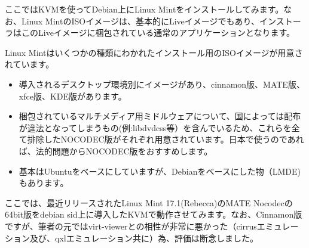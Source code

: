 \documentclass[mingoth,a4paper]{jsarticle}
\begin{document}
ここではKVMを使ってDebian上にLinux Mintをインストールしてみます。なお、Linux MintのISOイメージは、基本的にLiveイメージでもあり、インストーラはこのLiveイメージに梱包されている通常のアプリケーションとなります。

Linux Mintはいくつかの種類にわかれたインストール用のISOイメージが用意されています。

\begin{itemize}
\item 導入されるデスクトップ環境別にイメージがあり、cinnamon版、MATE版、xfce版、KDE版があります。
\item 梱包されているマルチメディア用ミドルウェアについて、国によっては配布が違法となってしまうもの(例:libdvdcss等）を含んでいるため、これらを全て排除したNOCODEC版がそれぞれ用意されています。日本で使うのであれば、法的問題からNOCODEC版をおすすめします\cite{ref:linuxmint-illeagal-prog}。
\item 基本はUbuntuをベースにしていますが、Debianをベースにした物（LMDE)もあります。
\end{itemize}

ここでは、最近リリースされたLinux Mint 17.1(Rebecca)のMATE Nocodecの64bit版をdebian sid上に導入したKVMで動作させてみます。なお、Cinnamon版ですが、筆者の元ではvirt-viewerとの相性が非常に悪かった（cirrusエミュレーション及び、qxlエミュレーション共に）為、評価は断念しました。
\end{document}
